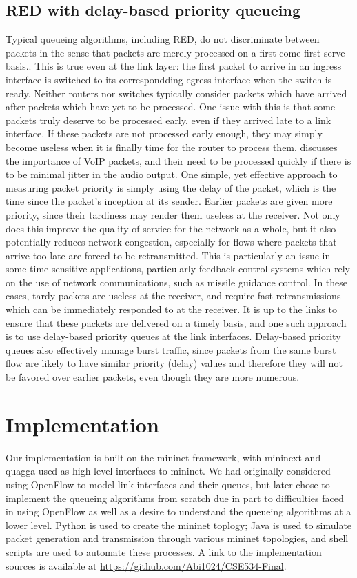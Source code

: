 \documentclass[12pt]{article}
\begin{document}
\subsection{RED with delay-based priority queueing}
Typical queueing algorithms, including RED, do not discriminate between packets in the sense that packets are merely processed on a first-come first-serve basis.. This is true even at the link layer: the first packet to arrive in an ingress interface is switched to its correspondding egress interface when the switch is ready. Neither routers nor switches typically consider packets which have arrived after packets which have yet to be processed. One issue with this is that some packets truly deserve to be processed early, even if they arrived late to a link interface. If these packets are not processed early enough, they may simply become useless when it is finally time for the router to process them. \cite{main_paper} discusses the importance of VoIP packets, and their need to be processed quickly if there is to be minimal jitter in the audio output. One simple, yet effective approach to measuring packet priority is simply using the delay of the packet, which is the time since the packet's inception at its sender. Earlier packets are given more priority, since their tardiness may render them useless at the receiver. Not only does this improve the quality of service for the network as a whole, but it also potentially reduces network congestion, especially for flows where packets that arrive too late are forced to be retransmitted. This is particularly an issue in some time-sensitive applications, particularly feedback control systems which rely on the use of network communications, such as missile guidance control. In these cases, tardy packets are useless at the receiver, and require fast retransmissions which can be immediately responded to at the receiver. It is up to the links to ensure that these packets are delivered on a timely basis, and one such approach is to use delay-based priority queues at the link interfaces. Delay-based priority queues also effectively manage burst traffic, since packets from the same burst flow are likely to have similar priority (delay) values and therefore they will not be favored over earlier packets, even though they are more numerous.

\section{Implementation}
Our implementation is built on the mininet framework, with mininext and quagga used as high-level interfaces to mininet. We had originally considered using OpenFlow to model link interfaces and their queues, but later chose to implement the queueing algorithms from scratch due in part to difficulties faced in using OpenFlow as well as a desire to understand the queueing algorithms at a lower level. Python is used to create the mininet toplogy; Java is used to simulate packet generation and transmission through various mininet topologies, and shell scripts are used to automate these processes. A link to the implementation sources is available at \url{https://github.com/Abi1024/CSE534-Final}. 
\end{document}
